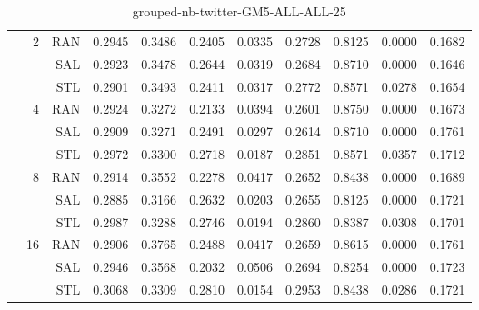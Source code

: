 \begin{center}
\begin{table}[htbp]
\begin{tabular}{ | r | r | r | r | r | r | r | r | r | r | r |}
 & \multirow{3}{*}{2} & RAN & 0.2945 & 0.3486 & 0.2405 & 0.0335 & 0.2728 & 0.8125 & 0.0000 & 0.1682\\ \cline{3-11}
 &   & SAL & 0.2923 & 0.3478 & 0.2644 & 0.0319 & 0.2684 & 0.8710 & 0.0000 & 0.1646\\ \cline{3-11}
 &   & STL & 0.2901 & 0.3493 & 0.2411 & 0.0317 & 0.2772 & 0.8571 & 0.0278 & 0.1654\\ \cline{2-11}
 & \multirow{3}{*}{4} & RAN & 0.2924 & 0.3272 & 0.2133 & 0.0394 & 0.2601 & 0.8750 & 0.0000 & 0.1673\\ \cline{3-11}
 &   & SAL & 0.2909 & 0.3271 & 0.2491 & 0.0297 & 0.2614 & 0.8710 & 0.0000 & 0.1761\\ \cline{3-11}
 &   & STL & 0.2972 & 0.3300 & 0.2718 & 0.0187 & 0.2851 & 0.8571 & 0.0357 & 0.1712\\ \cline{2-11}
 & \multirow{3}{*}{8} & RAN & 0.2914 & 0.3552 & 0.2278 & 0.0417 & 0.2652 & 0.8438 & 0.0000 & 0.1689\\ \cline{3-11}
 &   & SAL & 0.2885 & 0.3166 & 0.2632 & 0.0203 & 0.2655 & 0.8125 & 0.0000 & 0.1721\\ \cline{3-11}
 &   & STL & 0.2987 & 0.3288 & 0.2746 & 0.0194 & 0.2860 & 0.8387 & 0.0308 & 0.1701\\ \cline{2-11}
 & \multirow{3}{*}{16} & RAN & 0.2906 & 0.3765 & 0.2488 & 0.0417 & 0.2659 & 0.8615 & 0.0000 & 0.1761\\ \cline{3-11}
 &   & SAL & 0.2946 & 0.3568 & 0.2032 & 0.0506 & 0.2694 & 0.8254 & 0.0000 & 0.1723\\ \cline{3-11}
 &   & STL & 0.3068 & 0.3309 & 0.2810 & 0.0154 & 0.2953 & 0.8438 & 0.0286 & 0.1721\\ \cline{2-11}
\hline
\end{tabular}
\caption{grouped-nb-twitter-GM5-ALL-ALL-25}
\end{table}
\end{center}

